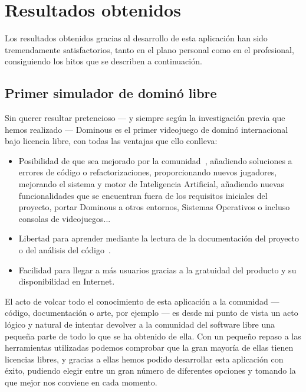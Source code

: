 

\section{Resultados obtenidos}

Los resultados obtenidos gracias al desarrollo de esta aplicación han sido tremendamente satisfactorios, tanto en el
plano personal como en el profesional, consiguiendo los hitos que se describen a continuación. \\

\subsection{Primer simulador de dominó libre}

Sin querer resultar pretencioso --- y siempre según la investigación previa que hemos realizado --- Dominous es el primer
videojuego de dominó internacional bajo licencia libre, con todas las ventajas que ello conlleva:

\begin{itemize}
    \item Posibilidad de que sea mejorado por la comunidad~\cite{raymond01a}, añadiendo soluciones a errores de código o refactorizaciones, proporcionando nuevos jugadores, mejorando el sistema y motor de Inteligencia Artificial, añadiendo nuevas
        funcionalidades que se encuentran fuera de los requisitos iniciales del proyecto, portar Dominous a otros
        entornos, Sistemas Operativos o incluso consolas de videojuegos...
    \item Libertad para aprender mediante la lectura de la documentación del proyecto o del análisis del código~\cite{sobre_swlibre_2004}.
    \item Facilidad para llegar a más usuarios gracias a la gratuidad del producto y su disponibilidad en Internet.
\end{itemize}

El acto de volcar todo el conocimiento de esta aplicación a la comunidad --- código, documentación o arte, por ejemplo --- es desde
mi punto de vista un acto lógico y natural de intentar devolver a la comunidad del software libre una pequeña 
parte de todo lo que se ha obtenido de ella. Con un pequeño repaso a las herramientas utilizadas podemos comprobar
que la gran mayoría de ellas tienen licencias libres, y gracias a ellas hemos podido desarrollar esta aplicación con éxito,
pudiendo elegir entre un gran número de diferentes opciones y tomando la que mejor nos conviene en cada momento.



